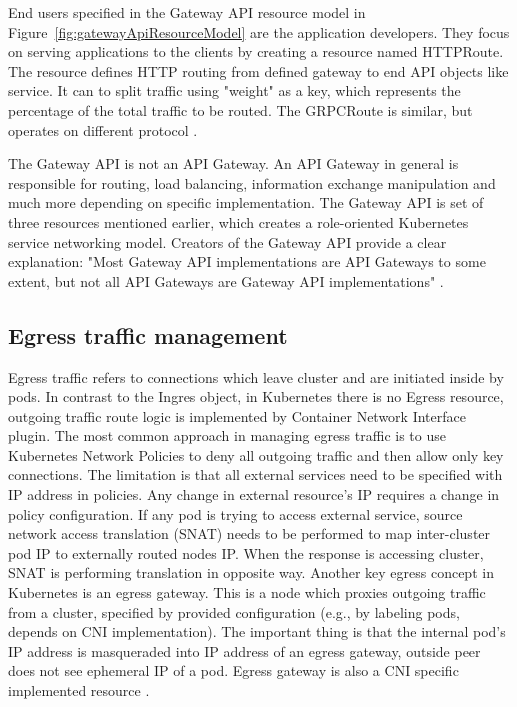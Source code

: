 End users specified in the Gateway API resource model in Figure~\ref{fig:gatewayApiResourceModel} are the application developers. They focus on serving applications to the clients by creating a resource named HTTPRoute. The resource defines HTTP routing from defined gateway to end API objects like service. It can to split traffic using "weight" as a key, which represents the percentage of the total traffic to be routed. The GRPCRoute is similar, but operates on different protocol \cite{KubernetesDocs}\cite{KubernetesGatewayAPI}. 



The Gateway API is not an API Gateway. An API Gateway in general is responsible for routing, load balancing, information exchange manipulation and much more depending on specific implementation. The Gateway API is set of three resources mentioned earlier, which creates a role-oriented Kubernetes service networking model. Creators of the Gateway API provide a clear explanation: "Most Gateway API implementations are API Gateways to some extent, but not all API Gateways are Gateway API implementations" \cite{KubernetesGatewayAPI}. 


\subsection{Egress traffic management}
\label{sec:egressTrafficMngmnt}

Egress traffic refers to connections which leave cluster and are initiated inside by pods. In contrast to the Ingres object, in Kubernetes there is no Egress resource, outgoing traffic route logic is implemented by Container Network Interface plugin. The most common approach in managing egress traffic is to use Kubernetes Network Policies to deny all outgoing traffic and then allow only key connections. The limitation is that all external services need to be specified with IP address in policies. Any change in external resource's IP requires a change in policy configuration. If any pod is trying to access external service, source network access translation (SNAT) needs to be performed to map inter-cluster pod IP to externally routed nodes IP. When the response is accessing cluster, SNAT is performing translation in opposite way. Another key egress concept in Kubernetes is an egress gateway. This is a node which proxies outgoing traffic from a cluster, specified by provided configuration (e.g., by labeling pods, depends on CNI implementation). The important thing is that the internal pod's IP address is masqueraded into IP address of an egress gateway, outside peer does not see ephemeral IP of a pod. Egress gateway is also a CNI specific implemented resource \cite{CalicoDocs}\cite{CiliumDocs}. 


